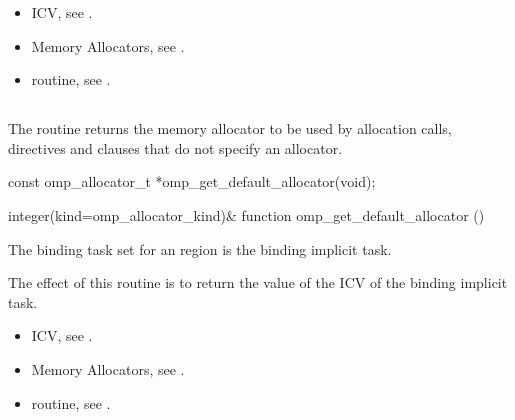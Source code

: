 \crossreferences

\begin{itemize}
\item {} ICV, see .
\item Memory Allocators, see .
\item {} routine, see .
\end{itemize}

\subsection{}
\label{subsec:omp_get_default_allocator}

\summary
The  routine returns the memory allocator to be used by allocation calls,  directives and  clauses that do not specify an allocator.

\format
\begin{ccppspecific}
\begin{ompcFunction}
const omp_allocator_t *omp_get_default_allocator(void);
\end{ompcFunction}
\end{ccppspecific}
\begin{fortranspecific}
\begin{ompfFunction}
integer(kind=omp_allocator_kind)&
function omp_get_default_allocator ()
\end{ompfFunction}
\end{fortranspecific}

\binding

The binding task set for an  region is the binding implicit task.

\effect

The effect of this routine is to return the value of the  ICV of the binding implicit task.

\crossreferences
\begin{itemize}
\item {} ICV, see .
\item Memory Allocators, see .
\item {} routine, see .
\end{itemize}




